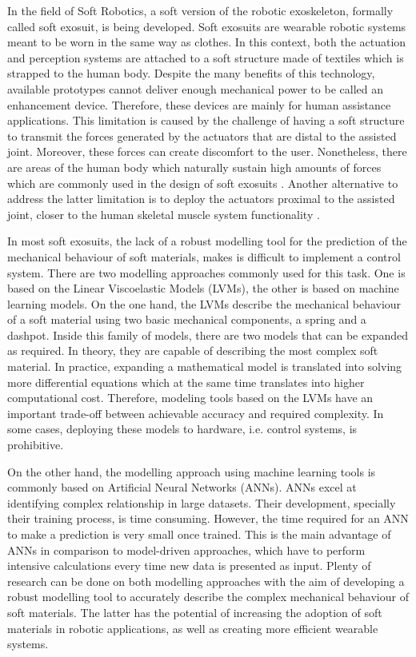 In the field of Soft Robotics, a soft version of the robotic exoskeleton, formally called soft exosuit, is being developed. Soft exosuits are wearable robotic systems meant to be worn in the same way as clothes. In this context, both the actuation and perception systems are attached to a soft structure made of textiles which is strapped to the human body. Despite the many benefits of this technology, available prototypes cannot deliver enough mechanical power to be called an enhancement device. Therefore, these devices are mainly for human assistance applications. This limitation is caused by the challenge of having a soft structure to transmit the forces generated by the actuators that are distal to the assisted joint. Moreover, these forces can create discomfort to the user. Nonetheless, there are areas of the human body which naturally sustain high amounts of forces which are commonly used in the design of soft exosuits \cite{wehner2013lightweight}. Another alternative to address the latter limitation is to deploy the actuators proximal to the assisted joint, closer to the human skeletal muscle system functionality \cite{park2014design,park2011bio}.

In most soft exosuits, the lack of a robust modelling tool for the prediction of the mechanical behaviour of soft materials, makes is difficult to implement a control system. There are two modelling approaches commonly used for this task. One is based on the Linear Viscoelastic Models (LVMs), the other is based on machine learning models. On the one hand, the LVMs describe the mechanical behaviour of a soft material using two basic mechanical components, a spring and a dashpot. Inside this family of models, there are two models that can be expanded as required. In theory, they are capable of describing the most complex soft material. In practice, expanding a mathematical model is translated into solving more differential equations which at the same time translates into higher computational cost. Therefore, modeling tools based on the LVMs have an important trade-off between achievable accuracy and required complexity. In some cases, deploying these models to hardware, i.e. control systems, is prohibitive. 

On the other hand, the modelling approach using machine learning tools is commonly based on Artificial Neural Networks (ANNs). ANNs excel at identifying complex relationship in large datasets. Their development, specially their training process, is time consuming. However, the time required for an ANN to make a prediction is very small once trained. This is the main advantage of ANNs in comparison to model-driven approaches, which have to perform intensive calculations every time new data is presented as input. Plenty of research can be done on both modelling approaches with the aim of developing a robust modelling tool to accurately describe the complex mechanical behaviour of soft materials. The latter has the potential of increasing the adoption of soft materials in robotic applications, as well as creating more efficient wearable systems.

